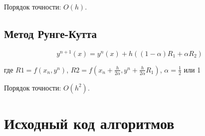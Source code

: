 \documentclass[a4paper,14pt, unknownkeysallowed]{extreport}
\begin{document}
\indent Порядок точности: $O(h)$.


\section{Метод Рунге-Кутта}

\begin{equation}
    \label{rk}
    y^{n+1}(x) = y^{n}(x) + h ((1-\alpha) R_1 + \alpha R_2)
\end{equation}\newline

где $R1 = f(x_{n}, y^{n})$, $R2 = f(x_{n} + \frac{h}{2\alpha}, y^{n} + \frac{h}{2\alpha}R_1)$, $\alpha = \frac{1}{2}$ или 1\newline

Порядок точности: $O(h^2)$.

\chapter{Исходный код алгоритмов}
\end{document}
